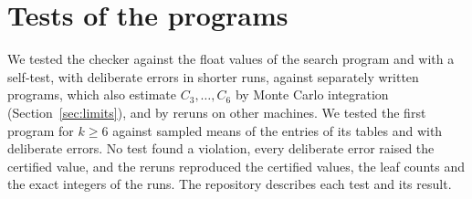 \documentclass[11pt]{amsart}
\theoremstyle{definition}
\theoremstyle{remark}
\numberwithin{equation}{section}
\begin{document}
\section{Tests of the programs}\label{sec:checks}
We tested the checker against the float values of the search program and with a self-test, with deliberate errors in shorter runs, against separately written programs, which also estimate $C_3,\dots,C_6$ by Monte Carlo integration (Section~\ref{sec:limits}), and by reruns on other machines. We tested the first program for $k\ge6$ against sampled means of the entries of its tables and with deliberate errors. No test found a violation, every deliberate error raised the certified value, and the reruns reproduced the certified values, the leaf counts and the exact integers of the runs. The repository describes each test and its result.
\end{document}
